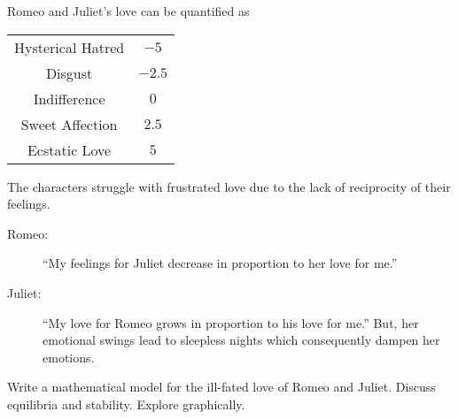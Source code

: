 \begin{problem}
    Romeo and Juliet's love can be quantified as
    \begin{center}
        \begin{tabular}{|c|c|}
            \hline
            Hysterical Hatred & $-5$ \\
            Disgust & $-2.5$ \\
            Indifference & $0$ \\
            Sweet Affection & $2.5$ \\
            Ecstatic Love & $5$ \\ \hline
        \end{tabular}
    \end{center}
    The characters struggle with frustrated love due to the lack of reciprocity of their
    feelings.
    \begin{description}
        \item[Romeo:] ``My feelings for Juliet decrease in proportion to her love for
            me.''
        \item[Juliet:] ``My love for Romeo grows in proportion to his love for me.''
            But, her emotional swings lead to sleepless nights which consequently
            dampen her emotions.
    \end{description}
    Write a mathematical model for the ill-fated love of Romeo and Juliet.  Discuss
    equilibria and stability. Explore graphically. 
\end{problem}


